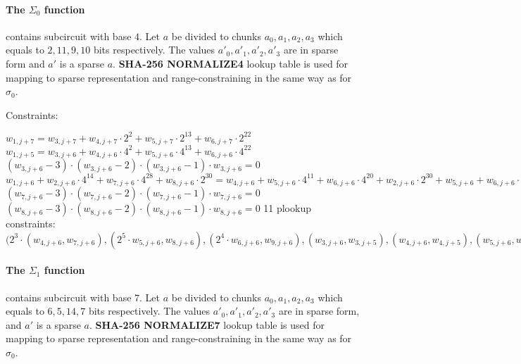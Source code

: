 \paragraph{The $\Sigma_0$ function}
contains subcircuit with base $4$.
Let $a$ be divided to chunks $a_0, a_1, a_2, a_3$ which equals to $2, 11, 9, 10$ bits respectively.
The values $a'_0, a'_1, a'_2, a'_3$ are in sparse form and $a'$ is a sparse $a$.
\textbf{SHA-256 NORMALIZE4} lookup table is used for mapping to sparse representation and range-constraining in the same way as for $\sigma_0$.

Constraints:
\begin{center}
    $w_{1, j + 7} = w_{3, j + 7} + w_{4, j + 7} \cdot 2^{2} + w_{5, j + 7} \cdot 2^{13} + w_{6, j + 7} \cdot 2^{22}$ \\
    $w_{1, j + 5} = w_{3, j + 6} + w_{4, j + 6} \cdot 4^{2} + w_{5, j + 6} \cdot 4^{13} + w_{6, j + 6} \cdot 4^{22}$ \\
    $(w_{3,j + 6} - 3) \cdot (w_{3,j + 6} - 2) \cdot (w_{3,j + 6} - 1) \cdot w_{3,j + 6} = 0$ \\
    $w_{1, j + 6} + w_{2, j + 6} \cdot 4^{14} + w_{7, j + 6} \cdot 4^{28} + w_{8, j + 6} \cdot 2^{30} = w_{4, j + 6} + w_{5, j + 6} \cdot 4^{11} + w_{6, j + 6} \cdot 4^{20} + w_{2, j + 6} \cdot 2^{30} + w_{5, j + 6} + w_{6, j + 6} \cdot 4^{9} + w_{3, j + 6} \cdot 4^{19} + w_{4, j + 6} \cdot 4^{21} + w_{6, j + 6} + w_{3, j + 6} \cdot 4^{10}+ w_{4, j + 6} \cdot 4^{12} + w_{5, j + 6} \cdot 4^{23}$ \\
    $(w_{7, j + 6} - 3) \cdot (w_{7, j + 6} - 2) \cdot (w_{7, j + 6} - 1) \cdot w_{7, j + 6} = 0$
    $(w_{8, j + 6} - 3) \cdot (w_{8, j + 6} - 2) \cdot (w_{8, j + 6} - 1) \cdot w_{8, j + 6} = 0$
    11 plookup constraints: $(2^3 \cdot (w_{4, j + 6}, w_{7, j + 6}), (2^5 \cdot w_{5, j + 6}, w_{8, j + 6}), (2^4 \cdot w_{6, j+6}, w_{9, j + 6}), (w_{3,j + 6}, w_{3,j+5}), (w_{4, j + 6}, w_{4, j + 5}), (w_{5, j + 6}, w_{5, j + 5}), (w_{6, j + 6}, w_{6, j + 5}), (w_{6, j + 5}, w_{1, j + 6}), (w_{7, j + 5}, w_{2, j + 6}), (w_{8, j + 5}, w_{7, j + 6}), (w_{9, j + 5}, w_{8, j + 6})$ \\
\end{center}

\paragraph{The $\Sigma_1$ function}
contains subcircuit with base $7$.
Let $a$ be divided to chunks $a_0, a_1, a_2, a_3$ which equals to $6, 5, 14, 7$ bits respectively.
The values $a'_0, a'_1, a'_2, a'_3$ are in sparse form, and $a'$ is a sparse $a$.
\textbf{SHA-256 NORMALIZE7} lookup table is used for mapping to sparse representation and range-constraining in the same way as for $\sigma_0$.

